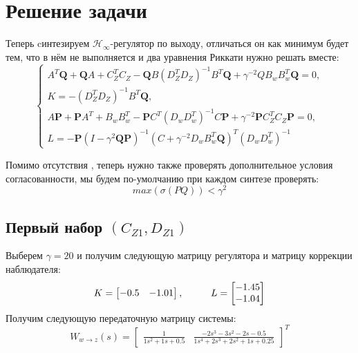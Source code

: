 \section{Решение задачи}


Теперь cинтезируем $\mathcal{H}_\infty$-регулятор по выходу, отличаться он как минимум будет тем, что  в нём не выполняется
и два уравнения Риккати нужно решать вместе:
$$
\begin{cases}
    A^T \mathbf{Q} + \textbf{Q}A + C^T_Z C_Z - \textbf{Q}B(D^T_Z D_Z)^{-1} B^T \textbf{Q}  + \gamma^{-2}QB_w B^T_w \textbf{Q}= 0, \\
    K = -(D^T_Z D_Z)^{-1} B^T \textbf{Q}, \\
    A\textbf{P} + \textbf{P}A^T + B_w B_w^T - \textbf{P} C^T (D_w D_w^T)^{-1} C \textbf{P} + \gamma^{-2}\textbf{P} C^T_Z C_Z \textbf{P} = 0, \\
    L = -\textbf{P}(I - \gamma^2 \textbf{Q} \textbf{P})^{-1} (C + \gamma^{-2}D_w B_w^T \textbf{Q})^T (D_w D_w^T)^{-1}
    
\end{cases} 
$$

Помимо отсутствия , теперь нужно также проверять дополнительное условия согласованности, 
мы будем по-умолчанию при каждом синтезе проверять:
$$
    max(\sigma(PQ)) < \gamma^2
$$

\newpage
\subsection{Первый набор $(C_{Z1},D_{Z1})$}

Выберем $\gamma = 20$ и получим следующую матрицу регулятора и матрицу коррекции наблюдателя: 
$$
    K = \begin{bmatrix}
        -0.5 & -1.01 \\
    \end{bmatrix}, \hspace*{1cm} 
    L = \begin{bmatrix}
        -1.45 \\
        -1.04 \\
    \end{bmatrix}
$$
Получим следующую передаточную матрицу системы:
$$
    W_{w\rightarrow z}(s) = \begin{bmatrix}\frac{1}{1s^{2} + 1s + 0.5} &  \frac{-2s^{3} - 3s^{2} - 2s - 0.5}{1s^{4} + 2s^{3} + 2s^{2} + 1s + 0.25} \end{bmatrix}^T
$$


